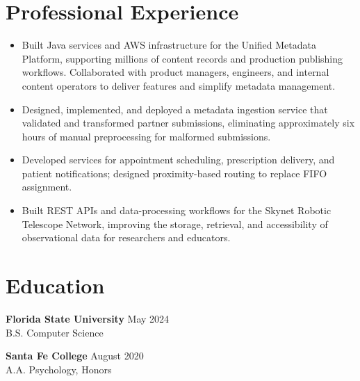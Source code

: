 \documentclass[10pt,letterpaper]{article}
\begin{document}
\section*{Professional Experience}
\begin{itemize}
\item Built Java services and AWS infrastructure for the Unified Metadata Platform, supporting millions of content records and production publishing workflows. Collaborated with product managers, engineers, and internal content operators to deliver features and simplify metadata management.
\end{itemize}
\vspace{3pt}
\begin{itemize}
\item Designed, implemented, and deployed a metadata ingestion service that validated and transformed partner submissions, eliminating approximately six hours of manual preprocessing for malformed submissions.
\end{itemize}
\vspace{3pt}
\begin{itemize}
\item Developed services for appointment scheduling, prescription delivery, and patient notifications; designed proximity-based routing to replace FIFO assignment.
\end{itemize}
\vspace{3pt}
\begin{itemize}
\item Built REST APIs and data-processing workflows for the Skynet Robotic Telescope Network, improving the storage, retrieval, and accessibility of observational data for researchers and educators.
\end{itemize}

\section*{Education}
\textbf{Florida State University} \hfill May 2024 \\
B.S. Computer Science
\vspace{3pt}

\textbf{Santa Fe College} \hfill August 2020 \\
A.A. Psychology, Honors
\end{document}
